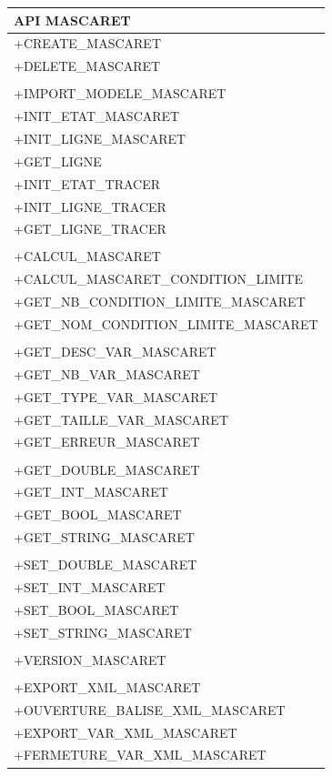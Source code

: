 \documentclass[a4paper,11pt]{article}
\begin{document}
\begin{center}
\begin{tabular}{|l|}
  \hline
 \huge{API MASCARET}  \\ 
 \hline
 +CREATE\_MASCARET \\  
 +DELETE\_MASCARET \\  
 \\
 +IMPORT\_MODELE\_MASCARET \\
 +INIT\_ETAT\_MASCARET \\
 +INIT\_LIGNE\_MASCARET \\
 +GET\_LIGNE \\
 +INIT\_ETAT\_TRACER \\
 +INIT\_LIGNE\_TRACER \\
 +GET\_LIGNE\_TRACER \\
 \\
 +CALCUL\_MASCARET \\
 +CALCUL\_MASCARET\_CONDITION\_LIMITE \\
 +GET\_NB\_CONDITION\_LIMITE\_MASCARET \\
 +GET\_NOM\_CONDITION\_LIMITE\_MASCARET \\
 \\
 +GET\_DESC\_VAR\_MASCARET \\
 +GET\_NB\_VAR\_MASCARET \\
 +GET\_TYPE\_VAR\_MASCARET \\
 +GET\_TAILLE\_VAR\_MASCARET \\
 +GET\_ERREUR\_MASCARET \\
 \\
 +GET\_DOUBLE\_MASCARET \\
 +GET\_INT\_MASCARET \\
 +GET\_BOOL\_MASCARET \\
 +GET\_STRING\_MASCARET \\
 \\
 +SET\_DOUBLE\_MASCARET \\
 +SET\_INT\_MASCARET \\
 +SET\_BOOL\_MASCARET \\
 +SET\_STRING\_MASCARET \\
 \\
 +VERSION\_MASCARET \\
 \\
 +EXPORT\_XML\_MASCARET \\
 +OUVERTURE\_BALISE\_XML\_MASCARET \\
 +EXPORT\_VAR\_XML\_MASCARET \\
 +FERMETURE\_VAR\_XML\_MASCARET \\
 \hline
\end{tabular}
\end{center}
\end{document}

